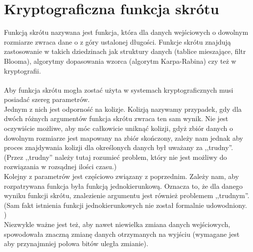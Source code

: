 \section{Kryptograficzna funkcja skrótu}
Funkcją skrótu nazywana jest funkcja, która dla danych wejściowych o dowolnym rozmiarze zwraca dane o z góry ustalonej długości. Funkcje skrótu znajdują zastosowanie w takich dziedzinach jak struktury danych (tablice mieszające, filtr Blooma), algorytmy dopasowania wzorca (algorytm Karpa-Rabina) czy też w kryptografii. \\ \\
Aby funkcja skrótu mogła zostać użyta w systemach kryptograficznych musi posiadać szereg parametrów. \\
Jednym z nich jest odporność na kolizje. Kolizją nazywamy przypadek, gdy dla dwóch różnych argumentów funkcja skrótu zwraca ten sam wynik. Nie jest oczywiście możliwe, aby móc całkowicie uniknąć kolizji, gdyż zbiór danych o dowolnym rozmiarze jest mapowany na zbiór skończony, zależy nam jednak aby proces znajdywania kolizji dla określonych danych był uważany za ,,trudny''. (Przez ,,trudny'' należy tutaj rozumieć problem, który nie jest możliwy do rozwiązania w rozsądnej ilości czasu.) \\
Kolejny z parametrów jest częściowo związany z poprzednim. Zależy nam, aby rozpatrywana funkcja była funkcją jednokierunkową. Oznacza to, że dla danego wyniku funkcji skrótu, znalezienie argumentu jest również problemem ,,trudnym''.
(Sam fakt istnienia funkcji jednokierunkowych nie został formalnie udowodniony. \cite{oneway}) \\
Niezwykle ważne jest też, aby nawet niewielka zmiana danych wejściowych, spowodowała znaczną zmianę danych otrzymanych na wyjściu (wymagane jest aby przynajmniej połowa bitów uległa zmianie).

